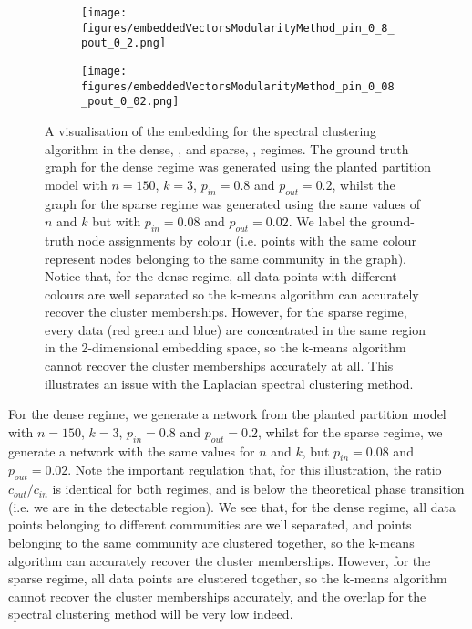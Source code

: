 \begin{figure}
	\centering
	\begin{subfigure}{.5\textwidth}
		\centering
		\texttt{[image: figures/embeddedVectorsModularityMethod\_pin\_0\_8\_pout\_0\_2.png]}
		\caption{}
		\label{fig:spectralClusteringEmbeddingVisualisationPin08}
	\end{subfigure}%
	\begin{subfigure}{.5\textwidth}
		\centering
		\texttt{[image: figures/embeddedVectorsModularityMethod\_pin\_0\_08\_pout\_0\_02.png]}
		\caption{}
		\label{fig:spectralClusteringEmbeddingVisualisationPin008}
	\end{subfigure}
	\caption[Visualisation of spectral clustering embedding in sparse and dense regimes]{\label{fig:spectralClusteringEmbeddingVisualisationPlots} A visualisation of the embedding for the spectral clustering algorithm in the dense, , and sparse, , regimes. The ground truth graph for the dense regime was generated using the planted partition model with $n=150$, $k=3$, $p_{in}=0.8$ and $p_{out}=0.2$, whilst the graph for the sparse regime was generated using the same values of $n$ and $k$ but with $p_{in}=0.08$ and $p_{out}=0.02$. We label the ground-truth node assignments by colour (i.e. points with the same colour represent nodes belonging to the same community in the graph). Notice that, for the dense regime, all data points with different colours are well separated so the k-means algorithm can accurately recover the cluster memberships. However, for the sparse regime, every data (red green and blue) are concentrated in the same region in the 2-dimensional embedding space, so the k-means algorithm cannot recover the cluster memberships accurately at all. This illustrates an issue with the Laplacian spectral clustering method.}
\end{figure}

For the dense regime, we generate a network from the planted partition model with $n=150$, $k=3$, $p_{in}=0.8$ and $p_{out}=0.2$, whilst for the sparse regime, we generate a network with the same values for $n$ and $k$, but $p_{in}=0.08$ and $p_{out}=0.02$.
Note the important regulation that, for this illustration, the ratio $c_{out}/c_{in}$ is identical for both regimes, and is below the theoretical phase transition (i.e. we are in the detectable region).
We see that, for the dense regime, all data points belonging to different communities are well separated, and points belonging to the same community are clustered together, so the k-means algorithm can accurately recover the cluster memberships.
However, for the sparse regime, all data points are clustered together, so the k-means algorithm cannot recover the cluster memberships accurately, and the overlap for the spectral clustering method will be very low indeed.

